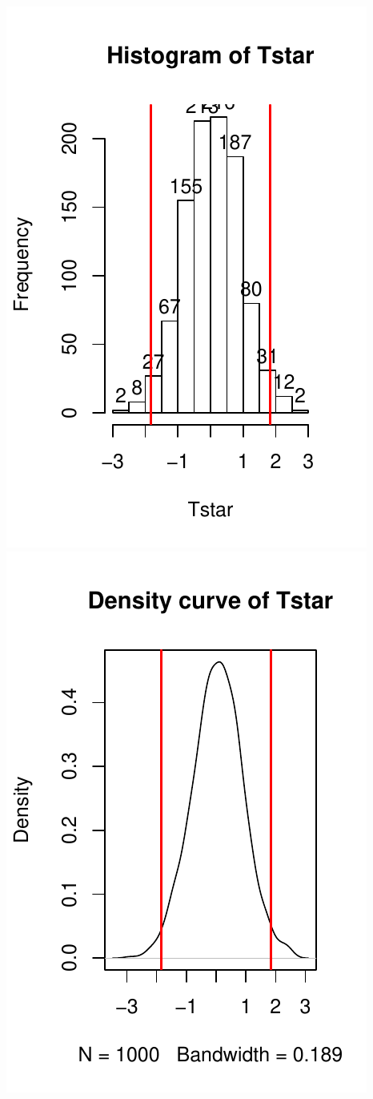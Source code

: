 \documentclass[]{book}
\begin{document}
\includegraphics{GreenwoodBanner_files/figure-latex/Figure2-11-1.pdf}
\includegraphics{GreenwoodBanner_files/figure-latex/Figure2-11-2.pdf}
\end{document}
